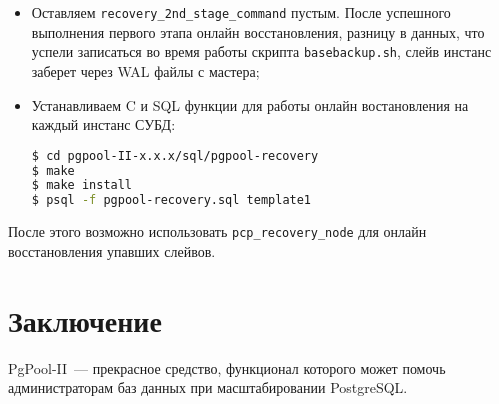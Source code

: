 \begin{itemize}
  \item Оставляем \lstinline!recovery_2nd_stage_command! пустым. После успешного выполнения первого этапа онлайн восстановления, разницу в данных, что успели записаться во время работы скрипта \lstinline!basebackup.sh!, слейв инстанс заберет через WAL файлы с мастера;

  \item Устанавливаем C и SQL функции для работы онлайн востановления на каждый инстанс СУБД:

\begin{lstlisting}[language=Bash,label=lst:pgpool46,caption=Устанавливаем C и SQL функции]
$ cd pgpool-II-x.x.x/sql/pgpool-recovery
$ make
$ make install
$ psql -f pgpool-recovery.sql template1
\end{lstlisting}

\end{itemize}

После этого возможно использовать \lstinline!pcp_recovery_node! для онлайн восстановления упавших слейвов.


\section{Заключение}

PgPool-II~--- прекрасное средство, функционал которого может помочь администраторам баз данных при масштабировании PostgreSQL.
